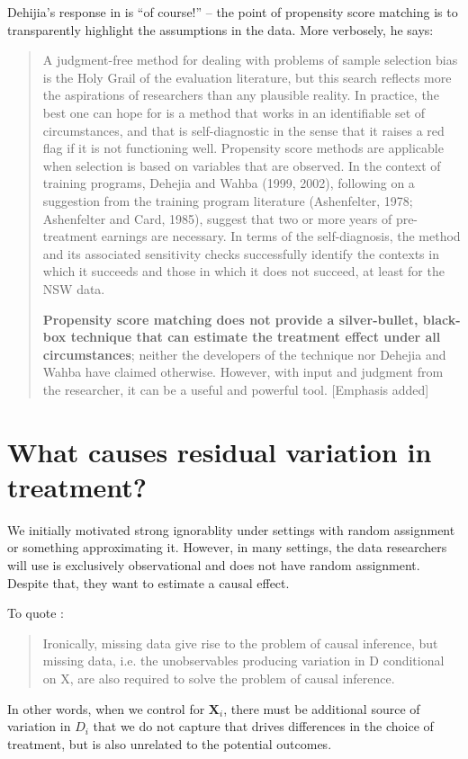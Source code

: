 \documentclass{tufte-handout}
\theoremstyle{break}
\newcommand{\bX}{\mathbf{X}}
\begin{document}
Dehijia's response in \citet{dehejia2005practical} is ``of course!'' -- the point of propensity score matching is to transparently highlight the assumptions in the data. More verbosely, he says:
\begin{quote}
  A judgment-free method for dealing with problems of sample selection bias is the Holy Grail of the evaluation literature, but this search reflects more the aspirations of researchers than any plausible reality. In practice, the best one can hope for is a method that works in an identifiable set of circumstances, and that is self-diagnostic in the sense that it raises a red flag if it is not functioning well. Propensity score methods are applicable when selection is based on variables that are observed. In the context of training programs, Dehejia and Wahba (1999, 2002), following on a suggestion from the training program literature (Ashenfelter, 1978; Ashenfelter and Card, 1985), suggest that two or more years of pre-treatment earnings are necessary. In terms of the self-diagnosis, the method and its associated sensitivity checks successfully identify the contexts in which it succeeds and those in which it does not succeed, at least for the NSW data. 
  
  \textbf{Propensity score matching does not provide a silver-bullet, black-box technique that can estimate the treatment effect under all circumstances}; neither the developers of the technique nor Dehejia and Wahba have claimed otherwise. However, with input and judgment from the researcher, it can be a useful and powerful tool. [Emphasis added]
\end{quote}

\section{What causes residual variation in treatment?}
We initially motivated strong ignorablity under settings with random assignment or something approximating it. However, in many settings, the data researchers will use is exclusively observational and does not have random assignment. Despite that, they want to estimate a causal effect.

To quote \citet{heckman1998matching}: 
\begin{quote}
  Ironically, missing data give rise to the problem of causal inference, but missing data, i.e. the unobservables producing variation in D conditional on X, are also required to solve the problem of causal inference.
\end{quote}
In other words, when we control for $\bX_{i}$, there must be additional source of variation in $D_{i}$ that we do not capture that drives differences in the choice of treatment, but is also unrelated to the potential outcomes.
\end{document}
